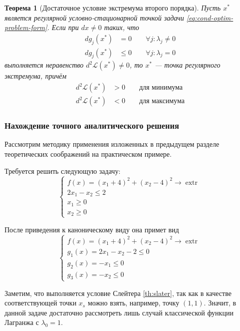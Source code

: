 \documentclass{article}
\renewcommand{\leq}{\leqslant}
\renewcommand{\geq}{\geqslant}
\newcommand{\La}{\mathcal{L}}
\DeclareMathOperator{\extr}{extr}
\newtheorem{thm}{Теорема}[section]
\theoremstyle{remark}
\theoremstyle{definition}
\numberwithin{equation}{section}
\begin{document}
\begin{thm}[Достаточное условие экстремума второго порядка]
  \label{th:then-extr-2}
  Пусть $x^*$ является регулярной условно-стационарной точкой задачи
  \eqref{eq:cond-optim-problem-form}. Если при $dx ≠ 0$ таких, что
    \begin{align*}
    dg_j(x^*) &= 0 \qquad \forall j: \lambda_j ≠ 0\\
    dg_j(x^*) &\leq 0 \qquad \forall j: \lambda_j=0
  \end{align*}
  выполняется неравенство $d^2\La(x^*) ≠ 0$, то $x^*$ — точка
  регулярного экстремума, причём
  \begin{align*}
    d^2\La(x^*) &> 0 \qquad \text{для минимума} \\
    d^2\La(x^*) &< 0 \qquad \text{для максимума}
  \end{align*}
\end{thm}

\clearpage
\subsubsection{Нахождение точного аналитического решения}

Рассмотрим методику применения изложенных в предыдущем разделе
теоретических соображений на практическом примере.

Требуется решить следующую задачу:
\begin{equation}
  \label{eq:cond-optim-problem-raw}
  \begin{cases}
    f(x) = (x_1+4)^2 + (x_2-4)^2 \to \extr \\
    2x_1 - x_2 \leq 2 \\
    x_1 \geq 0 \\
    x_2 \geq 0
  \end{cases}
\end{equation}

После приведения к каноническому виду она примет вид
\begin{equation}
  \label{eq:cond-optim-problem}
  \begin{cases}
    f(x) = (x_1+4)^2 + (x_2-4)^2 \to \extr \\
    g_1(x) = 2x_1 - x_2 - 2 \leq 0 \\
    g_2(x) = -x_1 \leq 0 \\
    g_3(x) = -x_2 \leq 0
  \end{cases}
\end{equation}

Заметим, что выполняется условие Слейтера \ref{th:slater}, так как в
качестве соответствующей точки $x_s$ можно взять, например, точку $(1,
1)$. Значит, в данной задаче достаточно рассмотреть лишь случай
классической функции Лагранжа с $\lambda_0=1$.
\end{document}
